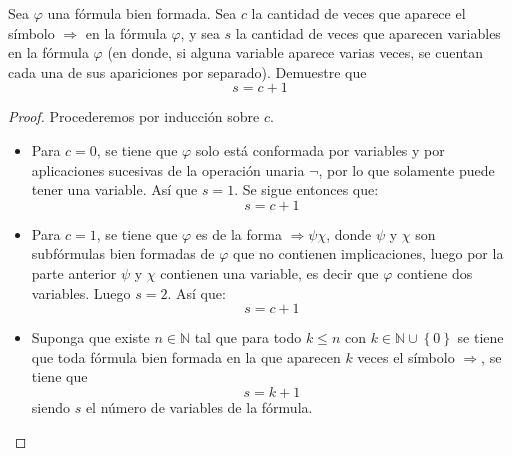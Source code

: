 \documentclass[12pt]{report}
\theoremstyle{largebreak}
\begin{document}
    \begin{excer}
        Sea $\varphi$ una fórmula bien formada. Sea $c$ la cantidad de veces que aparece el símbolo $\Rightarrow$ en la fórmula $\varphi$, y sea $s$ la cantidad de veces que aparecen variables en la fórmula $\varphi$ (en donde, si alguna variable aparece varias veces, se cuentan cada una de sus apariciones por separado). Demuestre que
        \begin{equation*}
            s=c+1
        \end{equation*}
    \end{excer}

    \begin{proof}
        Procederemos por inducción sobre $c$.
        \begin{itemize}
            \item Para $c=0$, se tiene que $\varphi$ solo está conformada por variables y por aplicaciones sucesivas de la operación unaria $\neg$, por lo que solamente puede tener una variable. Así que $s=1$. Se sigue entonces que:
            \begin{equation*}
                s=c+1
            \end{equation*}
            \item Para $c=1$, se tiene que $\varphi$ es de la forma $\Rightarrow\psi\chi$, donde $\psi$ y $\chi$ son subfórmulas bien formadas de $\varphi$ que no contienen implicaciones, luego por la parte anterior $\psi$ y $\chi$ contienen una variable, es decir que $\varphi$ contiene dos variables. Luego $s=2$. Así que:
            \begin{equation*}
                s=c+1
            \end{equation*}
            \item Suponga que existe $n\in\mathbb{N}$ tal que para todo $k\leq n$ con $k\in\mathbb{N}\cup\left\{0\right\}$ se tiene que toda fórmula bien formada en la que aparecen $k$ veces el símbolo $\Rightarrow$, se tiene que
            \begin{equation*}
                s=k+1
            \end{equation*}
            siendo $s$ el número de variables de la fórmula.


\end{itemize}
\end{proof}
\end{document}
